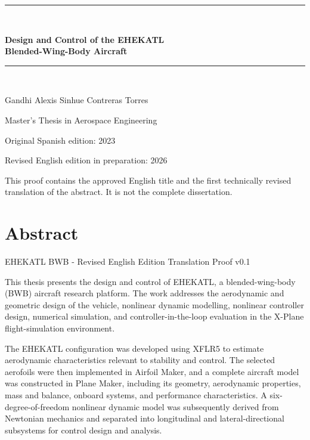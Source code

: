 \documentclass[11pt]{article}
\begin{document}
\begin{titlepage}
\thispagestyle{empty}
\centering
\vspace*{1.1in}
{\color{ehekatlteal}\rule{0.78\textwidth}{2pt}}\\[0.45in]
{\Huge\bfseries\color{ehekatlnavy}
Design and Control of the EHEKATL\\[0.18in]
Blended-Wing-Body Aircraft\par}
\vspace{0.4in}
{\color{ehekatlteal}\rule{0.78\textwidth}{2pt}}\\[0.65in]
{\Large Gandhi Alexis Sinhue Contreras Torres\par}
\vspace{0.3in}
{\large Master's Thesis in Aerospace Engineering\par}
\vfill
{\large Original Spanish edition: 2023\par}
\vspace{0.12in}
{\large Revised English edition in preparation: 2026\par}
\vspace{0.55in}
{\small This proof contains the approved English title and the first technically revised translation of the abstract. It is not the complete dissertation.\par}
\end{titlepage}

\section*{Abstract}
\begin{center}
\small EHEKATL BWB - Revised English Edition \hfill Translation Proof v0.1
\end{center}
\vspace{0.15in}

This thesis presents the design and control of EHEKATL, a blended-wing-body (BWB) aircraft research platform. The work addresses the aerodynamic and geometric design of the vehicle, nonlinear dynamic modelling, nonlinear controller design, numerical simulation, and controller-in-the-loop evaluation in the X-Plane flight-simulation environment.

The EHEKATL configuration was developed using XFLR5 to estimate aerodynamic characteristics relevant to stability and control. The selected aerofoils were then implemented in Airfoil Maker, and a complete aircraft model was constructed in Plane Maker, including its geometry, aerodynamic properties, mass and balance, onboard systems, and performance characteristics. A six-degree-of-freedom nonlinear dynamic model was subsequently derived from Newtonian mechanics and separated into longitudinal and lateral-directional subsystems for control design and analysis.
\end{document}
